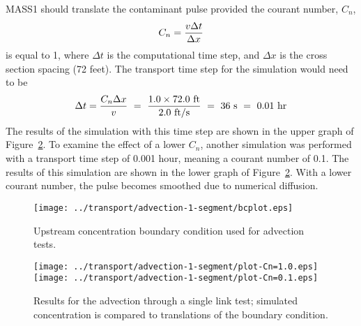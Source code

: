 \documentclass[12pt,dvips,letterpaper]{article}
\begin{document}
MASS1 should translate the contaminant pulse provided the courant
number, $C_{n}$,
\begin{equation}
  \label{eq:courant-number}
  C_{n} = { { v \Delta t } \over { \Delta x } }
\end{equation}
is equal to 1, where $\Delta t$ is the computational time step, and
$\Delta x$ is the cross section spacing (72 feet). The transport time
step for the simulation would need to be
\[
\Delta t = { { C_{n} \Delta x } \over v } ~ = ~ {{ 1.0 \times 72.0 ~
    \mathrm{ft}} \over {2.0 ~ \mathrm{ft} \slash \mathrm{s} }} ~ = ~
    36 ~\mathrm{s} ~ = ~ 0.01 ~ \mathrm{hr}
\]
The results of the simulation with this time step are shown in the
upper graph of Figure~\ref{fig:test-advection-1-results}.  To examine
the effect of a lower $C_{n}$, another simulation was performed with a
transport time step of 0.001 hour, meaning a courant number of 0.1.
The results of this simulation are shown in the lower graph of
Figure~\ref{fig:test-advection-1-results}.  With a lower courant
number, the pulse becomes smoothed due to numerical diffusion.  

\begin{figure}[htbp]
  \begin{center}
    \texttt{[image: ../transport/advection-1-segment/bcplot.eps]}
    \caption{Upstream concentration boundary condition used for
      advection tests.} 
    \label{fig:test-advection-bc}
  \end{center}
\end{figure}

\begin{figure}[htbp]
  \begin{center}
    \texttt{[image: ../transport/advection-1-segment/plot-Cn=1.0.eps]}
    \texttt{[image: ../transport/advection-1-segment/plot-Cn=0.1.eps]}
    \caption{Results for the advection through a single link test;
      simulated concentration is compared to translations of the
      boundary condition.} 
    \label{fig:test-advection-1-results}
  \end{center}
\end{figure}

\end{document}
